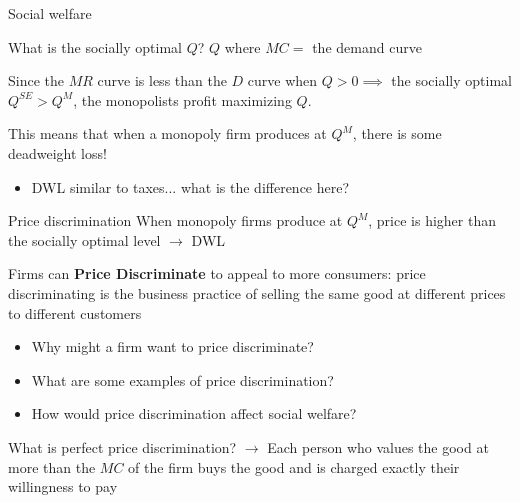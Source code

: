 \documentclass[compress]{beamer}
\begin{document}
\begin{frame}{Social welfare}
    \begin{block}{What is the socially optimal $Q$?}
        $Q$ where $MC = $ the demand curve
    \end{block}

    Since the $MR$ curve is less than the $D$ curve when $Q>0 \implies$ the socially optimal $Q^{SE} > Q^M $, the monopolists profit maximizing $Q$. 

    \vspace{3mm}

    This means that when a monopoly firm produces at $Q^M$, there is some deadweight loss!
    \begin{itemize}
        \item DWL similar to taxes... what is the difference here?
    \end{itemize}
\end{frame}

\begin{frame}{Price discrimination}
    When monopoly firms produce at $Q^M$, price is higher than the socially optimal level $\to$ DWL

    \begin{block}{Firms can\textbf{ Price Discriminate} to appeal to more consumers:}
        price discriminating is the business practice of selling the same good at different prices to different customers
        \begin{itemize}
            \item Why might a firm want to price discriminate?
            \item What are some examples of price discrimination?
            \item How would price discrimination affect social welfare?
        \end{itemize}
    \end{block}

    \vspace{2mm}

    What is perfect price discrimination? \pause $\to$ Each person who values the good at more than the $MC$ of the firm buys the good and is charged exactly their willingness to pay
\end{frame}
\end{document}
